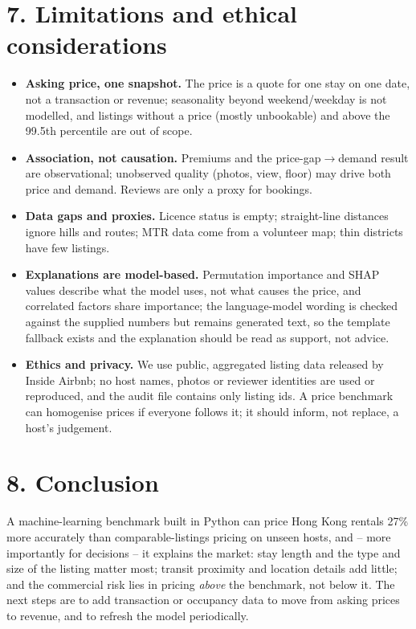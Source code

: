 \documentclass[10pt,a4paper]{article}
\begin{document}
\section*{7. Limitations and ethical considerations}
\begin{itemize}[leftmargin=0.55cm,itemsep=2pt,topsep=2pt,parsep=0pt]
\item \textbf{Asking price, one snapshot.} The price is a quote for one stay on one date, not a transaction or revenue; seasonality beyond weekend/weekday is not modelled, and listings without a price (mostly unbookable) and above the 99.5th percentile are out of scope.
\item \textbf{Association, not causation.} Premiums and the price-gap$\rightarrow$demand result are observational; unobserved quality (photos, view, floor) may drive both price and demand. Reviews are only a proxy for bookings.
\item \textbf{Data gaps and proxies.} Licence status is empty; straight-line distances ignore hills and routes; MTR data come from a volunteer map; thin districts have few listings.
\item \textbf{Explanations are model-based.} Permutation importance and SHAP values describe what the model uses, not what causes the price, and correlated factors share importance; the language-model wording is checked against the supplied numbers but remains generated text, so the template fallback exists and the explanation should be read as support, not advice.
\item \textbf{Ethics and privacy.} We use public, aggregated listing data released by Inside Airbnb; no host names, photos or reviewer identities are used or reproduced, and the audit file contains only listing ids. A price benchmark can homogenise prices if everyone follows it; it should inform, not replace, a host's judgement.
\end{itemize}
\section*{8. Conclusion}
{A machine-learning benchmark built in Python can price Hong Kong rentals 27\% more accurately than comparable-listings pricing on unseen hosts, and -- more importantly for decisions -- it explains the market: stay length and the type and size of the listing matter most; transit proximity and location details add little; and the commercial risk lies in pricing \textit{above} the benchmark, not below it. The next steps are to add transaction or occupancy data to move from asking prices to revenue, and to refresh the model periodically.\par}
\end{document}
